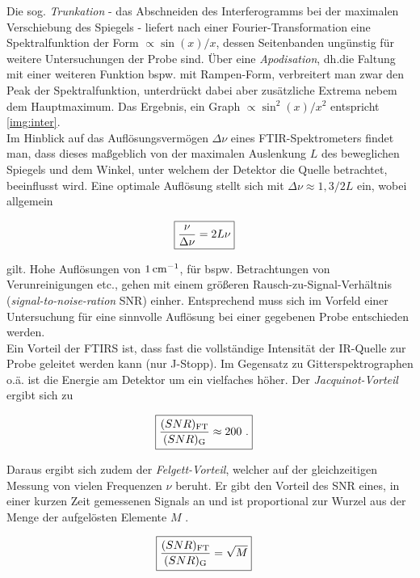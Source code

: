 \documentclass[numbers=noenddot,a4paper,10pt,twocolumn]{article}
\newcommand{\ix}[1]{_\text{#1}}
\newcommand{\tilt}[1]{\textit{#1}}
\begin{document}
		Die sog. \tilt{Trunkation} - das Abschneiden des Interferogramms bei der maximalen Verschiebung des Spiegels - liefert nach einer Fourier-Transformation eine Spektralfunktion der Form $\propto\sin(x)/x$, dessen Seitenbanden ung\"unstig f\"ur weitere Untersuchungen der Probe sind. \"Uber eine \tilt{Apodisation}, dh.die Faltung mit einer weiteren Funktion bspw. mit Rampen-Form, verbreitert man zwar den Peak der Spektralfunktion, unterdr\"uckt dabei aber zus\"atzliche Extrema nebem dem Hauptmaximum. Das Ergebnis, ein Graph $\propto\sin^{2}(x)/x^{2}$ entspricht \autoref{img:inter}.\\
		Im Hinblick auf das Aufl\"osungsverm\"ogen $\Delta\nu$ eines FTIR-Spektrometers findet man, dass dieses ma{\ss}geblich von der maximalen Auslenkung $L$ des beweglichen Spiegels und dem Winkel, unter welchem der Detektor die Quelle betrachtet, beeinflusst wird. Eine optimale Aufl\"osung stellt sich mit $\Delta\nu\approx1,3/2L$ ein, wobei allgemein
		
		\begin{align}
			\Aboxed{
			\frac{\nu}{\Delta\nu}=2L\nu
			} \nonumber
		\end{align} 
		
		gilt. Hohe Aufl\"osungen von $\unit[1]{cm^{-1}}$, f\"ur bspw. Betrachtungen von Verunreinigungen etc., gehen mit einem gr\"o{\ss}eren Rausch-zu-Signal-Verh\"altnis (\tilt{signal-to-noise-ration} SNR) einher. Entsprechend muss sich im Vorfeld einer Untersuchung f\"ur eine sinnvolle Aufl\"osung bei einer gegebenen Probe entschieden werden.\\
		Ein Vorteil der FTIRS ist, dass fast die vollst\"andige Intensit\"at der IR-Quelle zur Probe geleitet werden kann (nur J-Stopp). Im Gegensatz zu Gitterspektrographen o.\"a. ist die Energie am Detektor um ein vielfaches h\"oher. Der \tilt{Jacquinot-Vorteil} ergibt sich zu
		
		\begin{align}
			\Aboxed{
			\frac{(SNR)\ix{FT}}{(SNR)\ix{G}}\approx200\,\,.
			} \nonumber
		\end{align} 
		
		Daraus ergibt sich zudem der \tilt{Felgett-Vorteil}, welcher auf der gleichzeitigen Messung von vielen Frequenzen $\nu$ beruht. Er gibt den Vorteil des SNR eines, in einer kurzen Zeit gemessenen Signals an und ist proportional zur Wurzel aus der Menge der aufgel\"osten Elemente $M$ \cite{FTIRAns}.
		
		\begin{align}
			\Aboxed{
			\frac{(SNR)\ix{FT}}{(SNR)\ix{G}}=\sqrt{M}
			} \nonumber
		\end{align}
		
\end{document}
